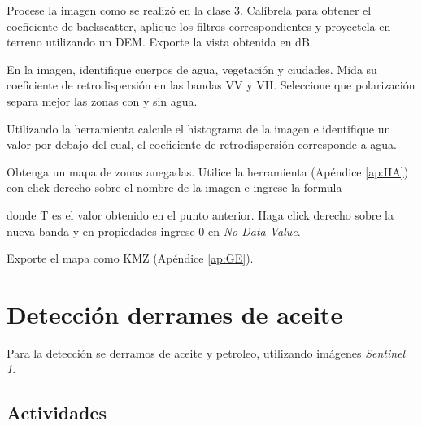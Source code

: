 \begin{que}
    Procese la imagen como se realizó en la clase 3. Calíbrela para obtener el coeficiente de backscatter, aplique los filtros correspondientes y proyectela en terreno utilizando un DEM. Exporte la vista obtenida en dB.
\end{que}

\begin{que}
    En la imagen, identifique cuerpos de agua, vegetación y ciudades. Mida su coeficiente de retrodispersión en las bandas VV y VH. Seleccione que polarización separa mejor las zonas con y sin agua.
\end{que}

\begin{que}
    Utilizando la herramienta  calcule el histograma de la imagen e identifique un valor por debajo del cual, el coeficiente de retrodispersión corresponde a agua.
\end{que}

\begin{que}
    Obtenga un mapa de zonas anegadas. Utilice la herramienta  (Apéndice \ref{ap:HA}) con click derecho sobre el nombre de la imagen e ingrese la formula
    \begin{center}
    \end{center}
    donde T es el valor obtenido en el punto anterior. Haga click derecho sobre la nueva banda y en propiedades ingrese 0 en \emph{No-Data Value}.
\end{que}

\begin{que}
    Exporte el mapa como KMZ (Apéndice \ref{ap:GE}).
\end{que}


\section{Detección derrames de aceite}

Para la detección se derramos de aceite y petroleo, utilizando imágenes \emph{Sentinel 1}.

%


\subsection{Actividades}

